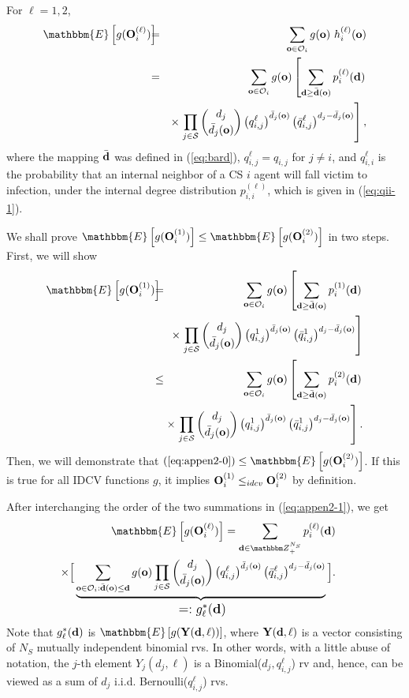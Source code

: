 \documentclass[10pt, journal, compsoc]{IEEEtran}
\newcommand {\cO}{{\mathcal{O}}}
\newcommand {\cS}{{\mathcal{S}}}
\newcommand {\bO} {{\bf O}}
\newcommand {\bY} {{\bf Y}}
\newcommand {\bd} {{\bf d}}
\newcommand {\bo} {{\bf o}}
\newcommand {\Z} {{\mathbbm Z}}
\newcommand{\beqa}{\begin{eqnarray}}
\newcommand{\eeqa}{\end{eqnarray}}
\newcommand{\beqan}{\begin{eqnarray*}}
\newcommand{\eeqan}{\end{eqnarray*}}
\newcommand{\myb}{\hspace{-0.1in}}
\newcommand{\myeq}{& \hspace{-0.1in} = & \hspace{-0.1in}}
\newcommand{\lb}{\nonumber \\}
\newcommand{\myleq}{& \myb \leq & \myb}
\newcommand{\myhb}{\hspace{-0.3in}}
\begin{document}
For $\ell = 1, 2$, 
\beqa
\mathbbm{E}\left[ g(\bO^{(\ell)}_i) \right]
\myeq \sum_{\bo \in \cO_i} g(\bo) \ h^{(\ell)}_i(\bo)
		\label{eq:appen2-1} \\
\myeq \sum_{\bo \in \cO_i} g(\bo) \left[
	\sum_{\bd \geq \bar{\bd}(\bo)} p^{(\ell)}_i(\bd) 
		\right. \lb 
&& \times \left. \prod_{j \in \cS} 
			{{d_j}\choose{\bar{d}_j(\bo)}}
			\left(q^\ell_{i,j}\right)^{\bar{d}_j(\bo)}
			\left( \bar{q}^\ell_{i,j} 
				\right)^{d_j - \bar{d}_j(\bo)}
			\right],  
	\nonumber
\eeqa
where the mapping $\bar{\bd}$ was defined in (\ref{eq:bard}), 
$q^\ell_{i,j} = q_{i,j}$ for $j \neq i$, and 
$q^\ell_{i,i}$ is the probability that an internal 
neighbor of a CS $i$ agent will fall victim to 
infection, under the internal degree distribution 
$p^{(\ell)}_{i,i}$, which is given in (\ref{eq:qii-1}).



We shall prove $\mathbbm{E}\left[ g(\bO^{(1)}_i) 
\right] \leq \mathbbm{E}\left[ g(\bO^{(2)}_i) \right]$
in two steps. First, we will show 
\beqa
\mathbbm{E}\left[ g(\bO^{(1)}_i) \right] 
\myeq \sum_{\bo \in \cO_i} g(\bo) \left[
	\sum_{\bd \geq \bar{\bd}(\bo)} p^{(1)}_i(\bd) 
		\right. \lb 
&& \myb \times \left. \prod_{j \in \cS} 
			{{d_j}\choose{\bar{d}_j(\bo)}}
			\left(q^1_{i,j}\right)^{\bar{d}_j(\bo)}
			\left( \bar{q}^1_{i,j} 
				\right)^{d_j - \bar{d}_j(\bo)}
			\right]
	\lb
\myleq \sum_{\bo \in \cO_i} g(\bo) \left[
	\sum_{\bd \geq \bar{\bd}(\bo)} p^{(2)}_i(\bd) 
		\right. \label{eq:appen2-0} \\
&& \myb \times \left. \prod_{j \in \cS} 
			{{d_j}\choose{\bar{d}_j(\bo)}}
			\left(q^1_{i,j}\right)^{\bar{d}_j(\bo)}
			\left( \bar{q}^1_{i,j} 
				\right)^{d_j - \bar{d}_j(\bo)}
			\right].
	\nonumber
\eeqa
Then, we will demonstrate that $(\ref{eq:appen2-0})
\leq \mathbbm{E}\left[ g(\bO^{(2)}_i) \right]$.
If this is true for all IDCV functions $g$, it implies
${\bf O}^{(1)}_i \leq_{idcv} {\bf O}^{(2)}_i$ by 
definition. 


After interchanging the order of the two summations
in (\ref{eq:appen2-1}), we get
\beqan
&& \myhb \mathbbm{E}\left[ g(\bO^{(\ell)}_i) \right]
	= \sum_{\bd \in \Z^{N_S}_+} p^{(\ell)}_i(\bd) \lb 
&& \myhb \times \Big[
	\underbrace{\sum_{\bo \in \cO_i: \bar{\bd}(\bo) \leq \bd} g(\bo) 
		\prod_{j \in \cS} {{d_j}\choose{\bar{d}_j(\bo)}}
			\left(q^\ell_{i,j}\right)^{\bar{d}_j(\bo)}
			\left( \bar{q}^\ell_{i,j} \right)^{d_j 
				- \bar{d}_j(\bo)}}_\text{
				\large{$=: g^*_\ell(\bd)$}} \Big]. 
\eeqan
Note that $g^*_\ell(\bd)$ is $\mathbbm{E}\left[ g(\bY(\bd, 
\ell)) \right]$, where $\bY(\bd, \ell)$ is a vector 
consisting of 
$N_S$ mutually independent binomial rvs. In other words, 
with a little abuse of notation, the $j$-th element
$Y_j(d_j, \ell)$ is a Binomial($d_j, q^\ell_{i,j}$) rv 
and, hence, can be viewed as a sum of $d_j$ i.i.d. 
Bernoulli($q^\ell_{i,j}$) rvs. 
\end{document}

